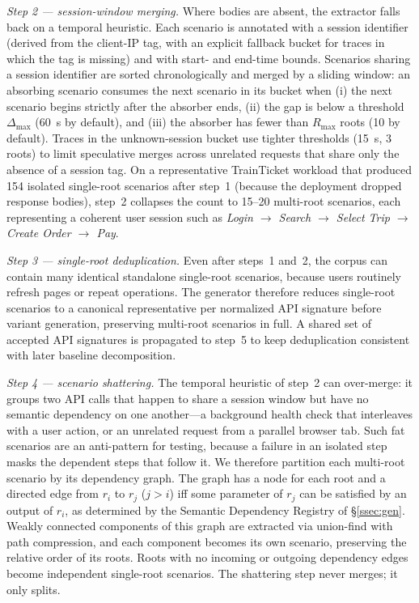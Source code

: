 \documentclass[conference]{IEEEtran}
\begin{document}
\emph{Step 2 --- session-window merging.}
Where bodies are absent, the extractor falls back on a temporal heuristic. Each scenario is annotated with a session identifier (derived from the client-IP tag, with an explicit fallback bucket for traces in which the tag is missing) and with start- and end-time bounds. Scenarios sharing a session identifier are sorted chronologically and merged by a sliding window: an absorbing scenario consumes the next scenario in its bucket when (i) the next scenario begins strictly after the absorber ends, (ii) the gap is below a threshold $\Delta_{\max}$ (60~s by default), and (iii) the absorber has fewer than $R_{\max}$ roots (10 by default). Traces in the unknown-session bucket use tighter thresholds (15~s, 3 roots) to limit speculative merges across unrelated requests that share only the absence of a session tag. On a representative TrainTicket workload that produced 154 isolated single-root scenarios after step~1 (because the deployment dropped response bodies), step~2 collapses the count to 15--20 multi-root scenarios, each representing a coherent user session such as \emph{Login $\to$ Search $\to$ Select Trip $\to$ Create Order $\to$ Pay}.

\emph{Step 3 --- single-root deduplication.}
Even after steps~1 and~2, the corpus can contain many identical standalone single-root scenarios, because users routinely refresh pages or repeat operations. The generator therefore reduces single-root scenarios to a canonical representative per normalized API signature before variant generation, preserving multi-root scenarios in full. A shared set of accepted API signatures is propagated to step~5 to keep deduplication consistent with later baseline decomposition.

\emph{Step 4 --- scenario shattering.}
The temporal heuristic of step~2 can over-merge: it groups two API calls that happen to share a session window but have no semantic dependency on one another---a background health check that interleaves with a user action, or an unrelated request from a parallel browser tab. Such fat scenarios are an anti-pattern for testing, because a failure in an isolated step masks the dependent steps that follow it. We therefore partition each multi-root scenario by its dependency graph. The graph has a node for each root and a directed edge from $r_i$ to $r_j$ ($j > i$) iff some parameter of $r_j$ can be satisfied by an output of $r_i$, as determined by the Semantic Dependency Registry of \S\ref{ssec:gen}. Weakly connected components of this graph are extracted via union-find with path compression, and each component becomes its own scenario, preserving the relative order of its roots. Roots with no incoming or outgoing dependency edges become independent single-root scenarios. The shattering step never merges; it only splits.
\end{document}
